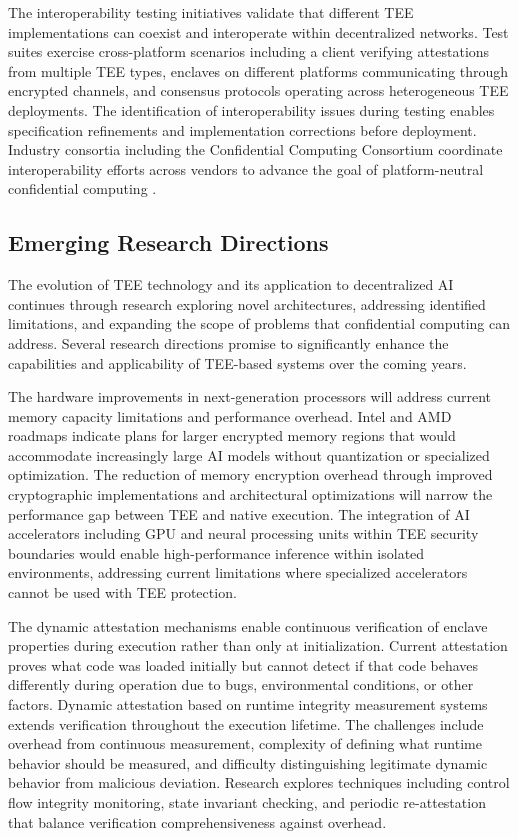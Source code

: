 The interoperability testing initiatives validate that different TEE implementations can coexist and interoperate within decentralized networks. Test suites exercise cross-platform scenarios including a client verifying attestations from multiple TEE types, enclaves on different platforms communicating through encrypted channels, and consensus protocols operating across heterogeneous TEE deployments. The identification of interoperability issues during testing enables specification refinements and implementation corrections before deployment. Industry consortia including the Confidential Computing Consortium coordinate interoperability efforts across vendors to advance the goal of platform-neutral confidential computing \cite{confidential_computing}.

\subsection{Emerging Research Directions}

The evolution of TEE technology and its application to decentralized AI continues through research exploring novel architectures, addressing identified limitations, and expanding the scope of problems that confidential computing can address. Several research directions promise to significantly enhance the capabilities and applicability of TEE-based systems over the coming years.

The hardware improvements in next-generation processors will address current memory capacity limitations and performance overhead. Intel and AMD roadmaps indicate plans for larger encrypted memory regions that would accommodate increasingly large AI models without quantization or specialized optimization. The reduction of memory encryption overhead through improved cryptographic implementations and architectural optimizations will narrow the performance gap between TEE and native execution. The integration of AI accelerators including GPU and neural processing units within TEE security boundaries would enable high-performance inference within isolated environments, addressing current limitations where specialized accelerators cannot be used with TEE protection.

The dynamic attestation mechanisms enable continuous verification of enclave properties during execution rather than only at initialization. Current attestation proves what code was loaded initially but cannot detect if that code behaves differently during operation due to bugs, environmental conditions, or other factors. Dynamic attestation based on runtime integrity measurement systems extends verification throughout the execution lifetime. The challenges include overhead from continuous measurement, complexity of defining what runtime behavior should be measured, and difficulty distinguishing legitimate dynamic behavior from malicious deviation. Research explores techniques including control flow integrity monitoring, state invariant checking, and periodic re-attestation that balance verification comprehensiveness against overhead.

